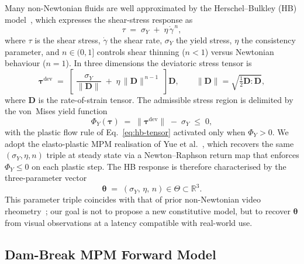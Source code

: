 Many non-Newtonian fluids are well approximated by the
Herschel--Bulkley (HB) model~\cite{herschel1926konsistenzmessungen},
which expresses the shear-stress response as
\begin{equation}
\label{eq:hb-scalar}
    \tau \;=\; \sigma_Y \;+\; \eta\,\dot\gamma^{\,n},
\end{equation}
where $\tau$ is the shear stress, $\dot\gamma$ the shear rate,
$\sigma_Y$ the yield stress, $\eta$ the consistency parameter, and
$n \in (0, 1]$ controls shear thinning ($n < 1$) versus Newtonian
behaviour ($n = 1$). In three dimensions the deviatoric stress tensor
is
\begin{equation}
\label{eq:hb-tensor}
    \boldsymbol{\tau}^{\mathrm{dev}}
    \;=\;
    \left[\;\frac{\sigma_Y}{\|\mathbf{D}\|}
    \;+\; \eta\,\|\mathbf{D}\|^{\,n-1}\;\right] \mathbf{D},
    \qquad
    \|\mathbf{D}\|
    = \sqrt{\tfrac{1}{2}\mathbf{D}\!:\!\mathbf{D}},
\end{equation}
where $\mathbf{D}$ is the rate-of-strain tensor. The admissible
stress region is delimited by the von~Mises yield function
\begin{equation}
\label{eq:hb-yield}
    \Phi_{Y}(\boldsymbol{\tau})
    \;=\; \|\boldsymbol{\tau}^{\mathrm{dev}}\| \;-\; \sigma_Y \;\le\; 0,
\end{equation}
with the plastic flow rule of Eq.~\eqref{eq:hb-tensor} activated only
when $\Phi_{Y} > 0$. We adopt the elasto-plastic MPM realisation of
Yue et al.~\cite{yue2015continuum}, which recovers the same
$(\sigma_Y, \eta, n)$ triple at steady state via a Newton--Raphson
return map that enforces $\Phi_{Y} \le 0$ on each plastic step. The HB
response is therefore characterised by the three-parameter vector
\begin{equation}
    \boldsymbol{\theta} \;=\; (\sigma_Y,\,\eta,\,n) \in \Theta \subset
    \mathbb{R}^{3}.
\end{equation}
This parameter triple coincides with that of prior non-Newtonian video
rheometry~\cite{hamamichi2023nonnewtonian}; our goal is not to
propose a new constitutive model, but to recover $\boldsymbol{\theta}$
from visual observations at a latency compatible with real-world use.


\subsection{Dam-Break MPM Forward Model}

